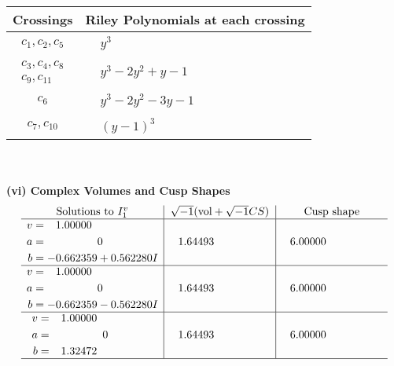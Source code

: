 \documentclass[1p]{elsarticle_modified}
\theoremstyle{definition}
\newcommand{\I}{\sqrt{-1}}
\begin{document}
\begin{tabular}{m{50pt}|m{274pt}}
Crossings & \hspace{64pt}Riley Polynomials at each crossing \\
\hline $$\begin{aligned}c_{1},c_{2},c_{5}\end{aligned}$$&$\begin{aligned}
&y^3
\end{aligned}$\\
\hline $$\begin{aligned}c_{3},c_{4},c_{8}\\c_{9},c_{11}\end{aligned}$$&$\begin{aligned}
&y^3-2 y^2+y-1
\end{aligned}$\\
\hline $$\begin{aligned}c_{6}\end{aligned}$$&$\begin{aligned}
&y^3-2 y^2-3 y-1
\end{aligned}$\\
\hline $$\begin{aligned}c_{7},c_{10}\end{aligned}$$&$\begin{aligned}
&(y-1)^3
\end{aligned}$\\
\hline
\end{tabular}\\~\\
\newpage\flushleft \textbf{(vi) Complex Volumes and Cusp Shapes}
$$\begin{array}{c|c|c}  
\text{Solutions to }I^v_{1}& \I (\text{vol} + \sqrt{-1}CS) & \text{Cusp shape}\\
 \hline 
\begin{aligned}
v &= \phantom{-}1.00000\phantom{ +0.000000I} \\
a &= \phantom{-0.000000 } 0 \\
b &= -0.662359 + 0.562280 I\end{aligned}
 & \phantom{-}1.64493\phantom{ +0.000000I} & \phantom{-}6.00000\phantom{ +0.000000I} \\ \hline\begin{aligned}
v &= \phantom{-}1.00000\phantom{ +0.000000I} \\
a &= \phantom{-0.000000 } 0 \\
b &= -0.662359 - 0.562280 I\end{aligned}
 & \phantom{-}1.64493\phantom{ +0.000000I} & \phantom{-}6.00000\phantom{ +0.000000I} \\ \hline\begin{aligned}
v &= \phantom{-}1.00000\phantom{ +0.000000I} \\
a &= \phantom{-0.000000 } 0 \\
b &= \phantom{-}1.32472\phantom{ +0.000000I}\end{aligned}
 & \phantom{-}1.64493\phantom{ +0.000000I} & \phantom{-}6.00000\phantom{ +0.000000I}\\
 \hline 
 \end{array}$$\newpage\newpage\renewcommand{\arraystretch}{1}
\end{document}
